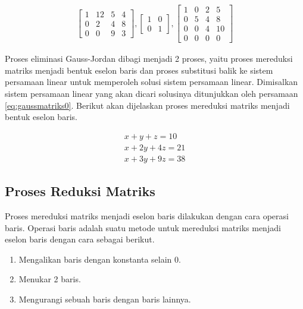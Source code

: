 \begin{center}
	\setlength\arraycolsep{10pt}
	\begin{gather}
		\begin{bmatrix}
				1 	& 12 	& 5 	& 4 		\\[1em]
				0 	& 2 	& 4 	& 8 		\\[1em]
				0 	& 0 	& 9 	& 3
		\end{bmatrix},
		\begin{bmatrix}
				1 & 0 	\\[1em]
				0 & 1
		\end{bmatrix},
		\begin{bmatrix}
				1 	& 0 	& 2 	& 5 		\\[1em]
				0 	& 5 	& 4 	& 8 		\\[1em]
				0 	& 0 	& 4 	& 10		\\[1em]
				0 	& 0 	& 0 	& 0
		\end{bmatrix} \label{eq:gaussmatriks1}
	\end{gather}
\end{center}

Proses eliminasi Gauss-Jordan dibagi menjadi 2 proses, yaitu proses mereduksi matriks menjadi bentuk eselon baris dan proses substitusi balik ke sistem persamaan linear untuk memperoleh solusi sistem persamaan linear. Dimisalkan sistem persamaan linear yang akan dicari solusinya ditunjukkan oleh persamaan \ref{eq:gaussmatriks0}. Berikut akan dijelaskan proses mereduksi matriks menjadi bentuk eselon baris.

\begin{gather}
	x + y + z = 10 \nonumber \\
	x + 2y + 4z = 21 \label{eq:gaussmatriks0} \\
	x + 3y + 9z = 38 \nonumber
\end{gather}

\subsection{Proses Reduksi Matriks}

Proses mereduksi matriks menjadi eselon baris dilakukan dengan cara operasi baris. Operasi baris adalah suatu metode untuk mereduksi matriks menjadi eselon baris dengan cara sebagai berikut.

\begin{enumerate}
	\item Mengalikan baris dengan konstanta selain 0.
	\item Menukar 2 baris.
	\item Mengurangi sebuah baris dengan baris lainnya.
\end{enumerate}

